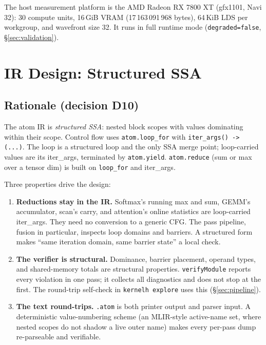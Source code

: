 \documentclass[10pt,twoside]{article}
\begin{document}
The host measurement platform is the AMD Radeon RX 7800 XT (gfx1101, Navi 32): 30 compute
units, 16\,GiB VRAM (17\,163\,091\,968 bytes), 64\,KiB LDS per workgroup, and wavefront size
32. It runs in full runtime mode (\texttt{degraded=false}, \S\ref{sec:validation}).

\section{IR Design: Structured SSA}
\label{sec:ir}

\subsection{Rationale (decision D10)}
\label{sec:d10}

The atom IR is \emph{structured SSA}: nested block scopes with values dominating within their
scope. Control flow uses \texttt{atom.loop\_for} with
\texttt{iter\_args() -> (...)}. The loop is a structured loop and the only SSA merge point;
loop-carried values are its iter\_args, terminated by \texttt{atom.yield}.
\texttt{atom.reduce} (sum or max over a tensor dim) is built on \texttt{loop\_for} and
iter\_args.

Three properties drive the design:
\begin{enumerate}
  \item \textbf{Reductions stay in the IR.} Softmax's running max and sum, GEMM's accumulator,
        scan's carry, and attention's online statistics are loop-carried iter\_args. They
        need no conversion to a generic CFG. The pass pipeline, fusion in particular, inspects
        loop domains and barriers. A structured form makes ``same iteration domain, same
        barrier state'' a local check.
  \item \textbf{The verifier is structural.} Dominance, barrier placement, operand types, and
        shared-memory totals are structural properties. \texttt{verifyModule} reports every
        violation in one pass; it collects all diagnostics and does not stop at the first. The
        round-trip self-check in \texttt{kernelh explore} uses this (\S\ref{sec:pipeline}).
  \item \textbf{The text round-trips.} \texttt{.atom} is both printer output and parser input.
        A deterministic value-numbering scheme (an MLIR-style active-name set, where nested
        scopes do not shadow a live outer name) makes every per-pass dump re-parseable and
        verifiable.
\end{enumerate}
\end{document}
